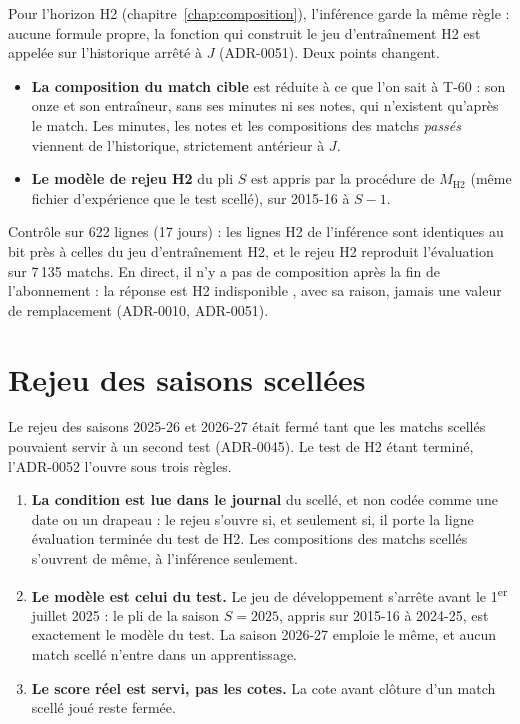 Pour l'horizon H2 (chapitre~\ref{chap:composition}), l'inférence garde la même règle : aucune formule
propre, la fonction qui construit le jeu d'entraînement H2 est appelée sur l'historique arrêté à \(J\)
(ADR-0051). Deux points changent.
\begin{itemize}
  \item \textbf{La composition du match cible} est réduite à ce que l'on sait à T-60 : son onze et son
        entraîneur, sans ses minutes ni ses notes, qui n'existent qu'après le match. Les minutes, les
        notes et les compositions des matchs \emph{passés} viennent de l'historique, strictement
        antérieur à \(J\).
  \item \textbf{Le modèle de rejeu H2} du pli \(S\) est appris par la procédure de \(M_{\mathrm{H2}}\)
        (même fichier d'expérience que le test scellé), sur 2015-16 à \(S - 1\).
\end{itemize}
Contrôle sur 622 lignes (17 jours) : les lignes H2 de l'inférence sont identiques au bit près à celles du
jeu d'entraînement H2, et le rejeu H2 reproduit l'évaluation sur 7\,135 matchs. En direct, il n'y a pas
de composition après la fin de l'abonnement : la réponse est \og H2 indisponible \fg{}, avec sa raison,
jamais une valeur de remplacement (ADR-0010, ADR-0051).

\section{Rejeu des saisons scellées}
\label{sec:inference-rejeu-scelle}

Le rejeu des saisons 2025-26 et 2026-27 était fermé tant que les matchs scellés pouvaient servir à un
second test (ADR-0045). Le test de H2 étant terminé, l'ADR-0052 l'ouvre sous trois règles.
\begin{enumerate}
  \item \textbf{La condition est lue dans le journal} du scellé, et non codée comme une date ou un
        drapeau : le rejeu s'ouvre si, et seulement si, il porte la ligne \og évaluation terminée \fg{} du
        test de H2. Les compositions des matchs scellés s'ouvrent de même, à l'inférence seulement.
  \item \textbf{Le modèle est celui du test.} Le jeu de développement s'arrête avant le
        1\textsuperscript{er} juillet 2025 : le pli de la saison \(S = 2025\), appris sur 2015-16 à 2024-25, est
        exactement le modèle du test. La saison 2026-27 emploie le même, et aucun match scellé n'entre dans
        un apprentissage.
  \item \textbf{Le score réel est servi, pas les cotes.} La cote avant clôture d'un match scellé joué reste
        fermée.
\end{enumerate}

